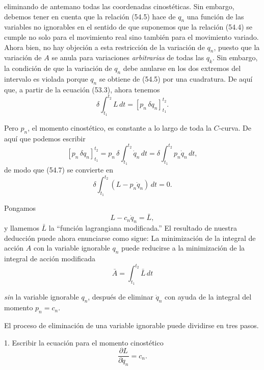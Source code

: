 \documentclass[12pt,a4paper]{book}
\begin{document}
eliminando de antemano todas las coordenadas cinostéticas. Sin embargo, debemos tener en cuenta que la relación (54.5) hace de $q_n$ una función de las variables no ignorables en el sentido de que suponemos que la relación (54.4) se cumple no solo para el movimiento real sino también para el movimiento variado. Ahora bien, no hay objeción a esta restricción de la variación de $q_n$, puesto que la variación de $A$ se anula para variaciones \textit{arbitrarias} de todas las $q_k$. Sin embargo, la condición de que la variación de $q_n$ debe anularse en los dos extremos del intervalo es violada porque $q_n$ se obtiene de (54.5) por una cuadratura. De aquí que, a partir de la ecuación (53.3), ahora tenemos
\begin{equation}
\delta \int_{t_1}^{t_2} L \, dt = \left[ p_n\,\delta q_n \right]_{t_1}^{t_2}. \tag{54.7}
\end{equation}

Pero $p_n$, el momento cinostético, es constante a lo largo de toda la $C$-curva. De aquí que podemos escribir
\begin{equation}
\left[ p_n\,\delta q_n \right]_{t_1}^{t_2} = p_n \,\delta \int_{t_1}^{t_2} \dot{q}_n \, dt = \delta \int_{t_1}^{t_2} p_n \dot{q}_n \, dt, \tag{54.8}
\end{equation}
de modo que (54.7) se convierte en
\begin{equation}
\delta \int_{t_1}^{t_2} (L - p_n \dot{q}_n) \, dt = 0. \tag{54.9}
\end{equation}

Pongamos
\begin{equation}
L - c_n \dot{q}_n = \bar{L}, \tag{54.10}
\end{equation}
y llamemos $\bar{L}$ la ``función lagrangiana modificada.'' El resultado de nuestra deducción puede ahora enunciarse como sigue: La minimización de la integral de acción $A$ con la variable ignorable $q_n$ puede reducirse a la minimización de la integral de acción modificada
\begin{equation}
\bar{A} = \int_{t_1}^{t_2} \bar{L}\,dt \tag{54.11}
\end{equation}

\textit{sin} la variable ignorable $q_n$, después de eliminar $\dot{q}_n$ con ayuda de la integral del momento $p_n = c_n$.

El proceso de eliminación de una variable ignorable puede dividirse en tres pasos.

1. Escribir la ecuación para el momento cinostético
\begin{equation}
\frac{\partial L}{\partial \dot{q}_n} = c_n. \tag*{$(a)$}
\end{equation}
\end{document}
